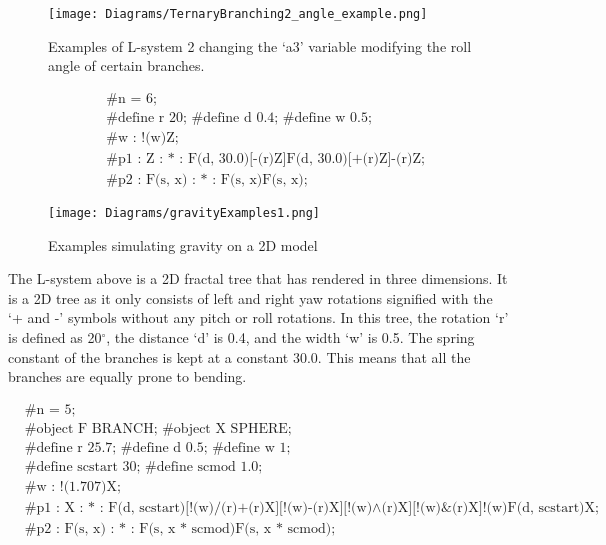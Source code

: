 \begin{figure}[htbp]
	{\centering
		\vspace{7px}
		\texttt{[image: Diagrams/TernaryBranching2\_angle\_example.png]}
		\caption{Examples of L-system 2 changing the `a3' variable modifying the roll angle of certain branches.} \label{example angle}
	}
\end{figure}
\FloatBarrier


\begin{singlespace}
\begin{equation}
\begin{aligned}
	&\textrm{\#n = 6;} \\
	&\textrm{\#define r 20; \#define d 0.4; \#define w 0.5;}\\
	&\textrm{\#w : !(w)Z;}\\
	&\textrm{\#p1 : Z : * : F(d, 30.0)[-(r)Z]F(d, 30.0)[+(r)Z]-(r)Z;}\\
	&\textrm{\#p2 : F(s, x) : * : F(s, x)F(s, x);}
\end{aligned}
\end{equation}
\end{singlespace}

\begin{figure}[htbp]
	{\centering
		\vspace{7px}
		\texttt{[image: Diagrams/gravityExamples1.png]}
		\label{3DAxisFigure} \label{Gravity applied to generated models}
		\caption{Examples simulating gravity on a 2D model}
	}
\end{figure}
\FloatBarrier

\noindent
The L-system above is a 2D fractal tree that has rendered in three dimensions. It is a 2D tree as it only consists of left and right yaw rotations signified with the `+ and -' symbols without any pitch or roll rotations. In this tree, the rotation `r' is defined as 20$^{\circ}$, the distance `d' is 0.4, and the width `w' is 0.5. The spring constant of the branches is kept at a constant 30.0. This means that all the branches are equally prone to bending. 

\begin{singlespace}
\begin{equation}
\begin{aligned}
	&\textrm{\#n = 5;} \\
	&\textrm{\#object F BRANCH; \#object X SPHERE;}\\
	&\textrm{\#define r 25.7; \#define d 0.5; \#define w 1;}\\
	&\textrm{\#define scstart 30; \#define scmod 1.0;}\\
	&\textrm{\#w : !(1.707)X;}\\
	&\textrm{\#p1 : X : * : F(d, scstart)[!(w)/(r)+(r)X][!(w)-(r)X][!(w)$\land$(r)X][!(w)\&(r)X]!(w)F(d, scstart)X;}\\
	&\textrm{\#p2 : F(s, x) : * : F(s, x * scmod)F(s, x * scmod);}
\end{aligned}
\end{equation}
\end{singlespace}

